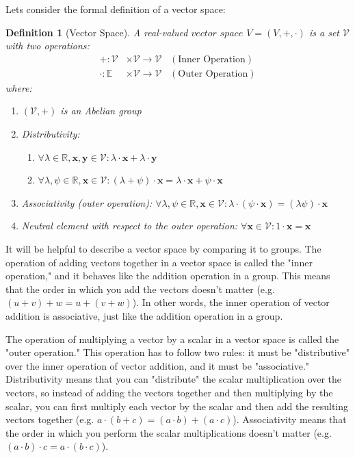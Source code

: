 \documentclass[12pt]{book}
\newtheorem{definition}{Definition}[section]
\begin{document}
	Lets consider the formal definition of a vector space:
	\begin{definition}[Vector Space]
		\normalfont A real-valued $\textit{vector space}$ $V = (V, +, \cdot)$ is a set $\mathcal{V}$ with two operations:
		\begin{align}
			+: \mathcal{V} &\times \mathcal{V} \rightarrow \mathcal{V} \hspace{10pt} (\text{Inner Operation}) \\
			\cdot: \mathbb{E} &\times \mathcal{V} \rightarrow \mathcal{V} \hspace{10pt} (\text{Outer Operation})
		\end{align}
		where:
		\begin{enumerate}
			\item $(\mathcal{V}, +)$ is an Abelian group
			\item Distributivity: 
			\begin{enumerate}
				\item $\forall \lambda \in \mathbb{R}, \textbf{x}, \textbf{y} \in \mathcal{V}: \lambda \cdot \textbf{x} + \lambda \cdot \textbf{y}$
				\item $\forall \lambda, \psi \in \mathbb{R}, \textbf{x} \in \mathcal{V}: (\lambda + \psi) \cdot \textbf{x} = \lambda \cdot \textbf{x} + \psi \cdot \textbf{x}$
			\end{enumerate} 
			\item Associativity (outer operation): $\forall\lambda, \psi \in \mathbb{R}, \textbf{x} \in \mathcal{V}: \lambda \cdot (\psi \cdot \textbf{x}) = (\lambda\psi)\cdot\textbf{x}$
			\item Neutral element with respect to the outer operation: $\forall \textbf{x} \in \mathcal{V}: 1 \cdot \textbf{x} = \textbf{x}$
		\end{enumerate}
	\end{definition}
	
	It will be helpful to describe a vector space by comparing it to groups. The operation of adding vectors together in a vector space is called the "inner operation," and it behaves like the addition operation in a group. This means that the order in which you add the vectors doesn't matter (e.g. $(u + v) + w = u + (v + w)$). In other words, the inner operation of vector addition is associative, just like the addition operation in a group.
	
	The operation of multiplying a vector by a scalar in a vector space is called the "outer operation." This operation has to follow two rules: it must be "distributive" over the inner operation of vector addition, and it must be "associative." Distributivity means that you can "distribute" the scalar multiplication over the vectors, so instead of adding the vectors together and then multiplying by the scalar, you can first multiply each vector by the scalar and then add the resulting vectors together (e.g. $a \cdot (b + c) = (a \cdot b) + (a \cdot c)$). Associativity means that the order in which you perform the scalar multiplications doesn't matter (e.g. $(a \cdot b) \cdot c = a \cdot (b \cdot c)$).
	
\end{document}

